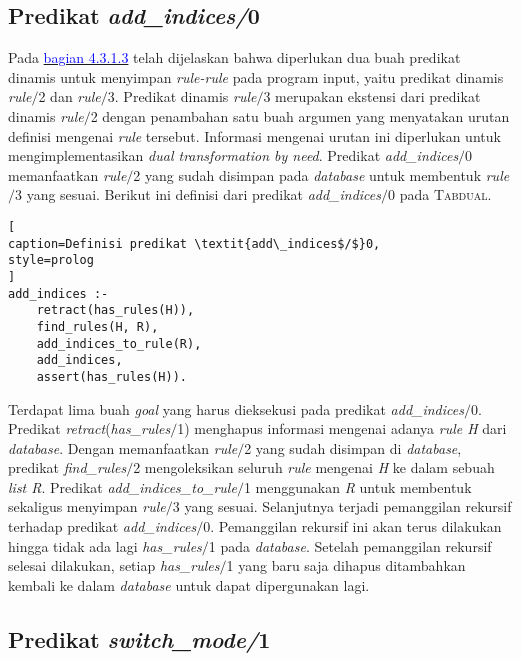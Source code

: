 \subsection{Predikat \textit{add\_indices/}0}
\label{subsec:add_indices}

Pada \hyperref[rule2to3]{\textcolor{blue}{bagian 4.3.1.3}} telah dijelaskan bahwa diperlukan dua buah predikat dinamis untuk menyimpan \textit{rule-rule} pada program input, yaitu predikat dinamis \textit{rule$/$}2 dan \textit{rule$/$}3. Predikat dinamis \textit{rule$/$}3 merupakan ekstensi dari predikat dinamis \textit{rule$/$}2 dengan penambahan satu buah argumen yang menyatakan urutan definisi mengenai \textit{rule} tersebut. Informasi mengenai urutan ini diperlukan untuk mengimplementasikan \textit{dual transformation by need}. Predikat \textit{add\_indices$/$}0 memanfaatkan \textit{rule$/$}2 yang sudah disimpan pada \textit{database} untuk membentuk \textit{rule$/$}3 yang sesuai. Berikut ini definisi dari predikat \textit{add\_indices$/$}0 pada \textsc{Tabdual}.
\\

\begin{lstlisting}[
caption=Definisi predikat \textit{add\_indices$/$}0,
style=prolog
]
add_indices :-
	retract(has_rules(H)),
	find_rules(H, R),
	add_indices_to_rule(R),
	add_indices,
	assert(has_rules(H)).
\end{lstlisting}

Terdapat lima buah \textit{goal} yang harus dieksekusi pada predikat \textit{add\_indices$/$}0. Predikat \textit{retract}(\textit{has\_rules$/$}1) menghapus informasi mengenai adanya \textit{rule H} dari \textit{database}. Dengan memanfaatkan \textit{rule$/$}2 yang sudah disimpan di \textit{database}, predikat \textit{find\_rules$/$}2 mengoleksikan seluruh \textit{rule} mengenai \textit{H} ke dalam sebuah \textit{list R}. Predikat \textit{add\_indices\_to\_rule$/$}1 menggunakan \textit{R} untuk membentuk sekaligus menyimpan \textit{rule$/$}3 yang sesuai. Selanjutnya terjadi pemanggilan rekursif terhadap predikat \textit{add\_indices$/$}0. Pemanggilan rekursif ini akan terus dilakukan hingga tidak ada lagi \textit{has\_rules$/$}1 pada \textit{database}. Setelah pemanggilan rekursif selesai dilakukan, setiap \textit{has\_rules$/$}1 yang baru saja dihapus ditambahkan kembali ke dalam \textit{database} untuk dapat dipergunakan lagi.

\label{subsec:mode}
\subsection{Predikat \textit{switch\_mode/}1}


